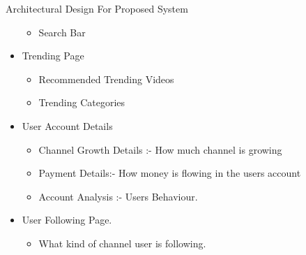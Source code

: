 \documentclass{beamer}
\begin{document}
\begin{frame}[allowframebreaks]{Architectural Design For Proposed System}
\begin{center}
\begin{itemize}
\begin{itemize}
      \item Search Bar 


    
  \end{itemize}
		\item Trending Page
\begin{itemize}
    \item Recommended Trending Videos


     \item Trending Categories



     


    
  \end{itemize}
  
  \item User Account Details
\begin{itemize}
    \item Channel Growth Details :- How much channel is growing 
     \item Payment Details:- How money is flowing in the users account 
     \item Account Analysis :- Users Behaviour.


  \end{itemize}
  \item User Following Page.
\begin{itemize}
    \item What kind of channel user is following.
 
   


  \end{itemize}
		\end{itemize}
    \end{center}
\end{frame}
\end{document}
